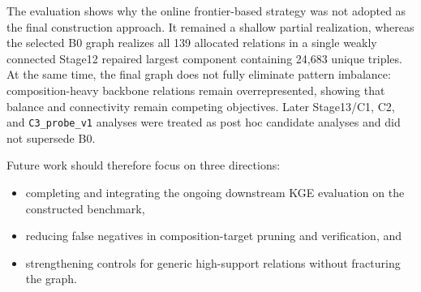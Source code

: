 \documentclass[12pt,a4paper]{article}
\begin{document}
The evaluation shows why the online frontier-based strategy was not adopted as the final construction approach. It remained a shallow partial realization, whereas the selected B0 graph realizes all 139 allocated relations in a single weakly connected Stage12 repaired largest component containing 24,683 unique triples. At the same time, the final graph does not fully eliminate pattern imbalance: composition-heavy backbone relations remain overrepresented, showing that balance and connectivity remain competing objectives. Later Stage13/C1, C2, and \texttt{C3\_probe\_v1} analyses were treated as post hoc candidate analyses and did not supersede B0.

Future work should therefore focus on three directions:

\begin{itemize}
    \item completing and integrating the ongoing downstream KGE evaluation on the constructed benchmark,
    \item reducing false negatives in composition-target pruning and verification, and
    \item strengthening controls for generic high-support relations without fracturing the graph.
\end{itemize}

\clearpage
\printbibliography
\end{document}
